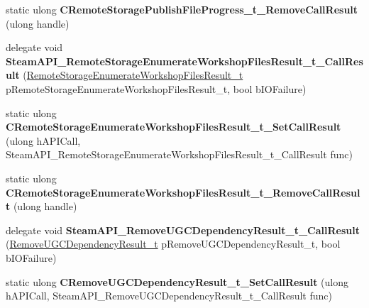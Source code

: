 \begin{DoxyCompactItemize}
\item 
\mbox{\label{class_valve_1_1_interop_1_1_native_entrypoints_ace465ec871b38b172bdf2a59d92e0a91}} 
static ulong {\bfseries C\+Remote\+Storage\+Publish\+File\+Progress\+\_\+t\+\_\+\+Remove\+Call\+Result} (ulong handle)
\item 
\mbox{\label{class_valve_1_1_interop_1_1_native_entrypoints_a64ea31b5f18b55fbeac4d1e5a1123e57}} 
delegate void {\bfseries Steam\+A\+P\+I\+\_\+\+Remote\+Storage\+Enumerate\+Workshop\+Files\+Result\+\_\+t\+\_\+\+Call\+Result} (\hyperlink{struct_valve_1_1_steamworks_1_1_remote_storage_enumerate_workshop_files_result__t}{Remote\+Storage\+Enumerate\+Workshop\+Files\+Result\+\_\+t} p\+Remote\+Storage\+Enumerate\+Workshop\+Files\+Result\+\_\+t, bool b\+I\+O\+Failure)
\item 
\mbox{\label{class_valve_1_1_interop_1_1_native_entrypoints_a82245a43b4793c07733eb1dcebaa6618}} 
static ulong {\bfseries C\+Remote\+Storage\+Enumerate\+Workshop\+Files\+Result\+\_\+t\+\_\+\+Set\+Call\+Result} (ulong h\+A\+P\+I\+Call, Steam\+A\+P\+I\+\_\+\+Remote\+Storage\+Enumerate\+Workshop\+Files\+Result\+\_\+t\+\_\+\+Call\+Result func)
\item 
\mbox{\label{class_valve_1_1_interop_1_1_native_entrypoints_a48bdd2b15c5e460815db16f6dcdd8bdc}} 
static ulong {\bfseries C\+Remote\+Storage\+Enumerate\+Workshop\+Files\+Result\+\_\+t\+\_\+\+Remove\+Call\+Result} (ulong handle)
\item 
\mbox{\label{class_valve_1_1_interop_1_1_native_entrypoints_acb02cebd0ae451b26005f21d252955fa}} 
delegate void {\bfseries Steam\+A\+P\+I\+\_\+\+Remove\+U\+G\+C\+Dependency\+Result\+\_\+t\+\_\+\+Call\+Result} (\hyperlink{struct_valve_1_1_steamworks_1_1_remove_u_g_c_dependency_result__t}{Remove\+U\+G\+C\+Dependency\+Result\+\_\+t} p\+Remove\+U\+G\+C\+Dependency\+Result\+\_\+t, bool b\+I\+O\+Failure)
\item 
\mbox{\label{class_valve_1_1_interop_1_1_native_entrypoints_ae7fa123415adce43d3791d09e14df4a0}} 
static ulong {\bfseries C\+Remove\+U\+G\+C\+Dependency\+Result\+\_\+t\+\_\+\+Set\+Call\+Result} (ulong h\+A\+P\+I\+Call, Steam\+A\+P\+I\+\_\+\+Remove\+U\+G\+C\+Dependency\+Result\+\_\+t\+\_\+\+Call\+Result func)

\end{DoxyCompactItemize}
